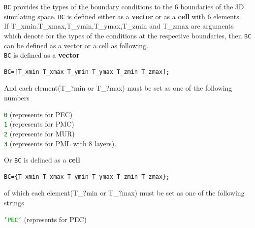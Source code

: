 \begin{myindentpar}\texttt{BC} provides the types of the boundary conditions to the 6 boundaries of the 3D simulating space.  
          \texttt{BC} is defined either as a \textbf{vector} or as a \textbf{cell} with 6  elements. \vspace{2mm}\\
          If  T\_xmin,T\_xmax,T\_ymin,T\_ymax,T\_zmin and T\_zmax are  arguments which denote for the types of the conditions at the respective boundaries, then \texttt{BC} can be defined as a vector or a cell as following.\vspace{2mm}\\
          \texttt{BC} is defined as a \textbf{vector}
	\begin{myindentpar}
	  \begin{lstlisting}[caption={\texttt{BC} in the form of a vector},label=BCinvector]
 BC=[T_xmin T_xmax T_ymin T_ymax T_zmin T_zmax]; 
	  \end{lstlisting}
          And   each  element(T\_?min or T\_?max)  must be set as one of the following numbers 
	    \begin{myindentpar}
	      \textcolor{green}{\texttt{0}}   \qquad  (represents for PEC)\\
	      \textcolor{green}{\texttt{1}}   \qquad  (represents for PMC)\\
	      \textcolor{green}{\texttt{2}}   \qquad  (represents for MUR)\\
	      \textcolor{green}{\texttt{3}}   \qquad  (represents for PML with 8 layers).
	    \end{myindentpar}	
      \end{myindentpar}  
          Or \texttt{BC} is defined as a \textbf{cell} 
	  \begin{myindentpar}
	  \begin{lstlisting}[caption={\texttt{BC} in the form of a cell},label=BCincell]
 BC={T_xmin T_xmax T_ymin T_ymax T_zmin T_zmax};
	  \end{lstlisting}
	  of which   each  element(T\_?min or T\_?max)  must be set as one of the following strings 
	  \begin{myindentpar}
	     \textcolor{green}{\texttt{'PEC'}} \qquad   (represents for PEC)\\

\end{myindentpar}
\end{myindentpar}
\end{myindentpar}
